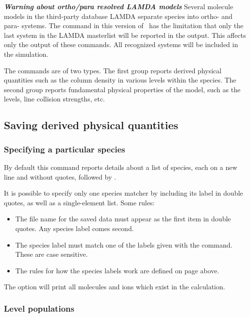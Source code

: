 \textbf{\textit{Warning about ortho/para resolved LAMDA models}}
Several molecule models in the third-party database LAMDA separate species 
into ortho- and para- systems.  
The   command in this version of \Cloudy\ has the limitation that 
only the last system in the LAMDA masterlist will be reported in the output.
This affects only the output of these commands.
All recognized systems will be included in the simulation.

The  commands are of two types.
The first group reports derived physical quantities such as the column density
in various levels within the species.
The second group reports fundamental physical properties of the model,
such as the levels, line collision strengths, etc.

\subsection{Saving derived physical quantities}
\label{sec:SaveSpeciesDerived}

\subsubsection{Specifying a particular species}
By default this command 
reports details about a list of species, each
on a new line and without quotes, followed by .

It is possible to specify only one species matcher by including its
label in double quotes, as well as a single-element list.  Some
rules:
\begin{itemize}
  \item The file name for the saved data must appear as the first
  item in double quotes.  Any species label comes second.
  \item The species label must match one of the labels 
  given with the  command.
  These are case sensitive.
  \item The rules for how the species labels work are defined on 
  page \pageref{sec:SpeciesDefine} above.
\end{itemize}

The  option will print all molecules and ions which exist
in the calculation.

\subsubsection{Level populations}
\label{sec:SaveSpeciesLevelPopulations}

